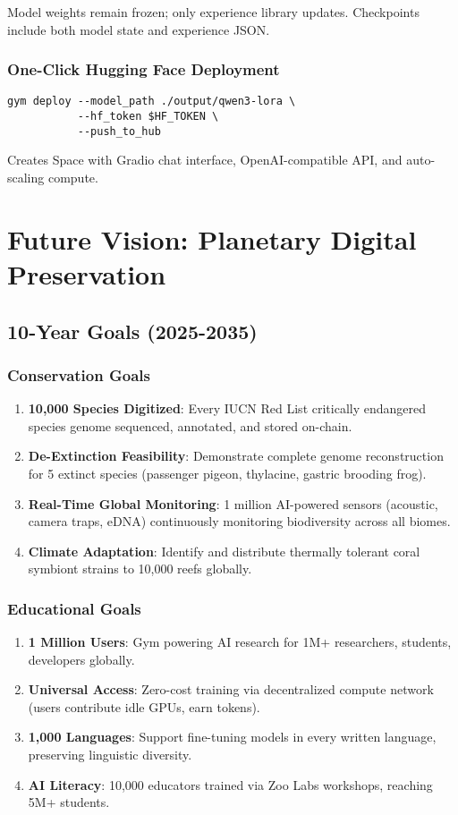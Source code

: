 \documentclass[twocolumn,11pt]{article}
\begin{document}
Model weights remain frozen; only experience library updates. Checkpoints include both model state and experience JSON.

\subsubsection{One-Click Hugging Face Deployment}
\begin{verbatim}
gym deploy --model_path ./output/qwen3-lora \
           --hf_token $HF_TOKEN \
           --push_to_hub
\end{verbatim}

Creates Space with Gradio chat interface, OpenAI-compatible API, and auto-scaling compute.

\section{Future Vision: Planetary Digital Preservation}

\subsection{10-Year Goals (2025-2035)}

\subsubsection{Conservation Goals}
\begin{enumerate}
    \item \textbf{10,000 Species Digitized}: Every IUCN Red List critically endangered species genome sequenced, annotated, and stored on-chain.
    \item \textbf{De-Extinction Feasibility}: Demonstrate complete genome reconstruction for 5 extinct species (passenger pigeon, thylacine, gastric brooding frog).
    \item \textbf{Real-Time Global Monitoring}: 1 million AI-powered sensors (acoustic, camera traps, eDNA) continuously monitoring biodiversity across all biomes.
    \item \textbf{Climate Adaptation}: Identify and distribute thermally tolerant coral symbiont strains to 10,000 reefs globally.
\end{enumerate}

\subsubsection{Educational Goals}
\begin{enumerate}
    \item \textbf{1 Million Users}: Gym powering AI research for 1M+ researchers, students, developers globally.
    \item \textbf{Universal Access}: Zero-cost training via decentralized compute network (users contribute idle GPUs, earn tokens).
    \item \textbf{1,000 Languages}: Support fine-tuning models in every written language, preserving linguistic diversity.
    \item \textbf{AI Literacy}: 10,000 educators trained via Zoo Labs workshops, reaching 5M+ students.
\end{enumerate}
\end{document}
